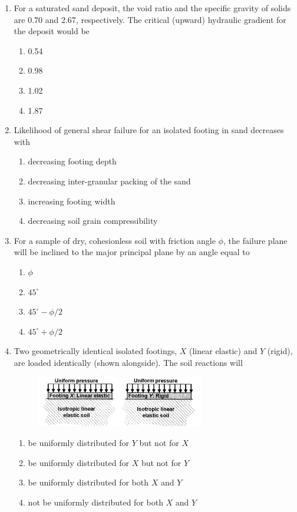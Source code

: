 \documentclass[journal,12pt,onecolumn]{IEEEtran}
\theoremstyle{remark}
\begin{document}
\begin{enumerate}
\item For a saturated sand deposit, the void ratio and the specific gravity of solids are 0.70 and 2.67, respectively. The critical (upward) hydraulic gradient for the deposit would be

\hfill{}
\begin{enumerate}
\item 0.54
\item 0.98
\item 1.02
\item 1.87
\end{enumerate}

\item Likelihood of general shear failure for an isolated footing in sand decreases with

\hfill{}
\begin{enumerate}
\item decreasing footing depth
\item decreasing inter-granular packing of the sand
\item increasing footing width
\item decreasing soil grain compressibility
\end{enumerate}

\item For a sample of dry, cohesionless soil with friction angle $\phi$, the failure plane will be inclined to the major principal plane by an angle equal to

\hfill{}
\begin{enumerate}
\item $\phi$
\item $45^\circ$
\item $45^\circ - \phi/2$
\item $45^\circ + \phi/2$
\end{enumerate}

\item Two geometrically identical isolated footings, $X$ (linear elastic) and $Y$ (rigid), are loaded identically (shown alongside). The soil reactions will

\hfill{}
\begin{figure}[H]
\centering
\includegraphics[width=0.4\columnwidth]{figs/q13.png}
\caption*{}
\label{fig:Q.13}
\end{figure}
\begin{enumerate}
\item be uniformly distributed for $Y$ but not for $X$
\item be uniformly distributed for $X$ but not for $Y$
\item be uniformly distributed for both $X$ and $Y$
\item not be uniformly distributed for both $X$ and $Y$
\end{enumerate}


\end{enumerate}
\end{document}
